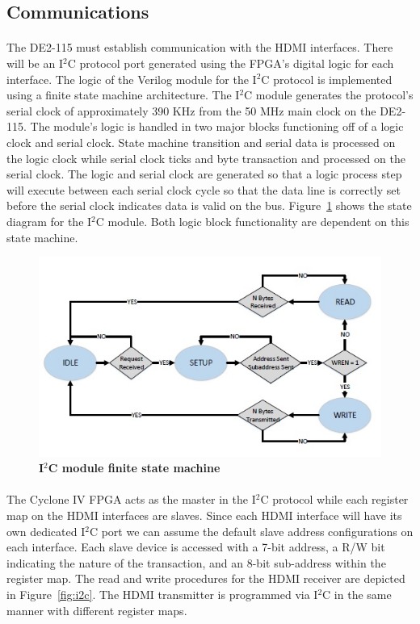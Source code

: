 \documentclass[pdftex,12pt,a4paper]{article}
\begin{document}
\subsection{Communications}

\paragraph{}
The DE2-115 must establish communication with the HDMI interfaces. There will be an I$^2$C protocol port generated using the FPGA's digital logic for each interface. The logic of the Verilog module for the I$^2$C protocol is implemented using a finite state machine architecture. The I$^2$C module generates the protocol's serial clock of approximately 390 KHz from the 50 MHz main clock on the DE2-115. The module's logic is handled in two major blocks functioning off of a logic clock and serial clock. State machine transition and serial data is processed on the logic clock while serial clock ticks and byte transaction and processed on the serial clock. The logic and serial clock are generated so that a logic process step will execute between each serial clock cycle so that the data line is correctly set before the serial clock indicates data is valid on the bus. Figure~\ref{fig:sm} shows the state diagram for the I$^2$C module. Both logic block functionality are dependent on this state machine.

\begin{figure}[H]
\centering
\includegraphics{I2C_SM.jpg}
\caption{\textbf{I$^2$C module finite state machine}}
\label{fig:sm}
\end{figure}

\paragraph{}
The Cyclone IV FPGA acts as the master in the I$^2$C protocol while each register map on the HDMI interfaces are slaves. Since each HDMI interface will have its own dedicated I$^2$C port we can assume the default slave address configurations on each interface.  Each slave device is accessed with a 7-bit address, a R/W bit indicating the nature of the transaction, and an 8-bit sub-address within the register map. The read and write procedures for the HDMI receiver are depicted in Figure~\ref{fig:i2c}\cite{Guide_ADV7611}. The HDMI transmitter is programmed via I$^2$C in the same manner with different register maps.
\end{document}
